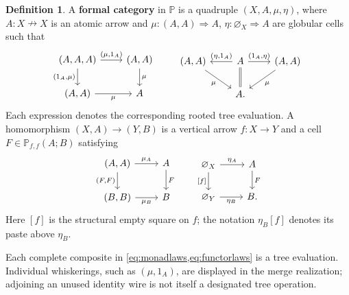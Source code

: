 \documentclass[11pt,reqno]{amsart}
\theoremstyle{plain}
\theoremstyle{definition}
\newtheorem{definition}[theorem]{Definition}
\theoremstyle{remark}
\numberwithin{equation}{section}
\newcommand{\Pcal}{\mathbb P}
\newcommand{\harr}{\mathrel{\nrightarrow}}
\newcommand{\cell}{\mathrel{\Longrightarrow}}
\newcommand{\emp}[1]{\varnothing_{#1}}
\begin{document}
\begin{definition}\label{def:formalcat}
A \textbf{formal category} in $\Pcal$ is a quadruple $(X,A,\mu,\eta)$,
where $A:X\harr X$ is an atomic arrow and
$\mu:(A,A)\cell A$, $\eta:\emp X\cell A$ are globular cells such that
\begin{equation}\label{eq:monadlaws}
\begin{tikzcd}[column sep=2.3em]
(A,A,A) \arrow[r,"{(\mu,1_A)}"] \arrow[d,"{(1_A,\mu)}"'] &
(A,A) \arrow[d,"\mu"]\\
(A,A) \arrow[r,"\mu"'] & A
\end{tikzcd}
\qquad
\begin{tikzcd}[column sep=2.2em]
(A,A) \arrow[dr,"\mu"'] &
A \arrow[l,"{(\eta,1_A)}"'] \arrow[r,"{(1_A,\eta)}"]
  \arrow[d,equal] & (A,A) \arrow[dl,"\mu"]\\
& A. &
\end{tikzcd}
\end{equation}
Each expression denotes the corresponding rooted tree evaluation.
A homomorphism $(X,A)\to(Y,B)$ is a vertical arrow $f:X\to Y$ and a
cell $F\in\Pcal_{f,f}(A;B)$ satisfying
\begin{equation}\label{eq:functorlaws}
\begin{tikzcd}
(A,A) \arrow[r,"\mu_A"] \arrow[d,"{(F,F)}"'] & A \arrow[d,"F"]\\
(B,B) \arrow[r,"\mu_B"'] & B
\end{tikzcd}
\qquad
\begin{tikzcd}
\emp X \arrow[r,"\eta_A"] \arrow[d,"{[f]}"'] & A \arrow[d,"F"]\\
\emp Y \arrow[r,"\eta_B"'] & B.
\end{tikzcd}
\end{equation}
Here $[f]$ is the structural empty square on $f$; the notation
$\eta_B[f]$ denotes its paste above $\eta_B$.
\end{definition}

Each complete composite in \cref{eq:monadlaws,eq:functorlaws} is a
tree evaluation. Individual whiskerings, such as $(\mu,1_A)$, are
displayed in the merge realization; adjoining an unused identity wire
is not itself a designated tree operation.
\end{document}
